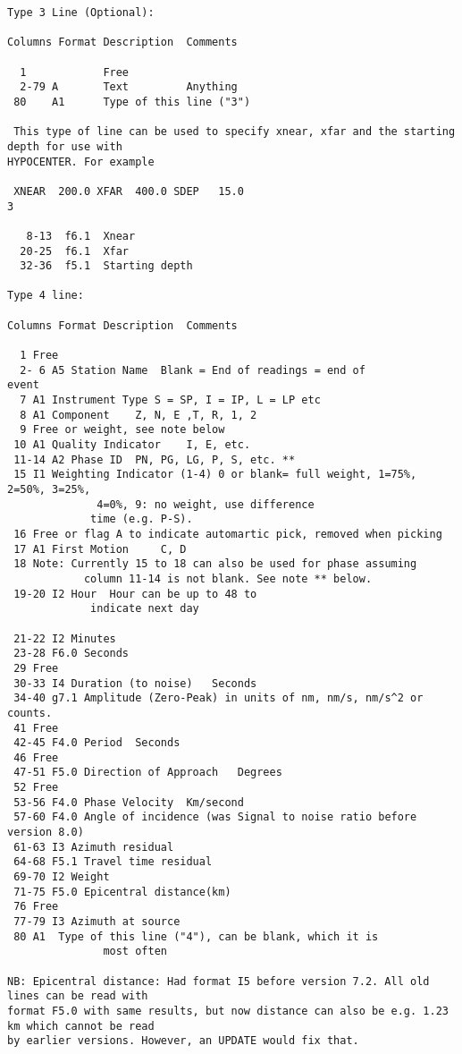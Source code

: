 \begin{verbatim}
Type 3 Line (Optional): 

Columns Format Description 	Comments 

  1            Free 
  2-79 A       Text      	Anything
 80    A1      Type of this line ("3") 

 This type of line can be used to specify xnear, xfar and the starting depth for use with
HYPOCENTER. For example 

 XNEAR  200.0 XFAR  400.0 SDEP   15.0                                          3

   8-13  f6.1  Xnear 
  20-25  f6.1  Xfar 
  32-36  f5.1  Starting depth 

Type 4 line: 

Columns Format Description 	Comments 

  1 Free 
  2- 6 A5 Station Name 	Blank = End of readings = end of
event 
  7 A1 Instrument Type S = SP, I = IP, L = LP etc
  8 A1 Component 	Z, N, E ,T, R, 1, 2
  9 Free or weight, see note below 
 10 A1 Quality Indicator 	I, E, etc.
 11-14 A2 Phase ID 	PN, PG, LG, P, S, etc. **
 15 I1 Weighting Indicator (1-4) 0 or blank= full weight, 1=75%, 2=50%, 3=25%,
              4=0%, 9: no weight, use difference
             time (e.g. P-S).
 16 Free or flag A to indicate automartic pick, removed when picking
 17 A1 First Motion 	C, D
 18 Note: Currently 15 to 18 can also be used for phase assuming
            column 11-14 is not blank. See note ** below. 
 19-20 I2 Hour 	Hour can be up to 48 to
             indicate next day 

 21-22 I2 Minutes 
 23-28 F6.0 Seconds 
 29 Free 
 30-33 I4 Duration (to noise) 	Seconds 
 34-40 g7.1 Amplitude (Zero-Peak) in units of nm, nm/s, nm/s^2 or counts.
 41 Free 
 42-45 F4.0 Period 	Seconds 
 46 Free 
 47-51 F5.0 Direction of Approach 	Degrees
 52 Free 
 53-56 F4.0 Phase Velocity 	Km/second
 57-60 F4.0 Angle of incidence (was Signal to noise ratio before version 8.0)
 61-63 I3 Azimuth residual 
 64-68 F5.1 Travel time residual 
 69-70 I2 Weight
 71-75 F5.0 Epicentral distance(km)
 76 Free 
 77-79 I3 Azimuth at source 
 80 A1 	Type of this line ("4"), can be blank, which it is
               most often 

NB: Epicentral distance: Had format I5 before version 7.2. All old lines can be read with
format F5.0 with same results, but now distance can also be e.g. 1.23 km which cannot be read
by earlier versions. However, an UPDATE would fix that. 
\end{verbatim}
